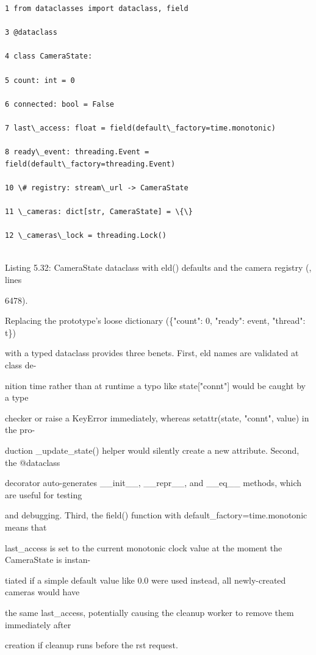 \begin{listingbox}
	\begin{verbatim}
1 from dataclasses import dataclass, field

3 @dataclass

4 class CameraState:

5 count: int = 0

6 connected: bool = False

7 last\_access: float = field(default\_factory=time.monotonic)

8 ready\_event: threading.Event = field(default\_factory=threading.Event)

10 \# registry: stream\_url -> CameraState

11 \_cameras: dict[str, CameraState] = \{\}

12 \_cameras\_lock = threading.Lock()


\end{verbatim}
\end{listingbox}
Listing 5.32: CameraState dataclass with eld() defaults and the camera registry (, lines

6478).

Replacing the prototype's loose dictionary (\{"count": 0, "ready": event, "thread": t\})

with a typed dataclass provides three benets. First, eld names are validated at class de-

nition time rather than at runtime  a typo like state["connt"] would be caught by a type

checker or raise a KeyError immediately, whereas setattr(state, "connt", value) in the pro-

duction \_update\_state() helper would silently create a new attribute. Second, the @dataclass

decorator auto-generates \_\_init\_\_, \_\_repr\_\_, and \_\_eq\_\_ methods, which are useful for testing

and debugging. Third, the field() function with default\_factory=time.monotonic means that

last\_access is set to the current monotonic clock value at the moment the CameraState is instan-

tiated  if a simple default value like 0.0 were used instead, all newly-created cameras would have

the same last\_access, potentially causing the cleanup worker to remove them immediately after

creation if cleanup runs before the rst request.

